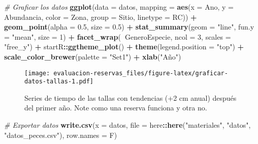 \documentclass[]{krantz}
\newenvironment{Shaded}{\begin{snugshade}}{\end{snugshade}}
\newcommand{\CommentTok}[1]{\textcolor[rgb]{0.56,0.35,0.01}{\textit{#1}}}
\newcommand{\DataTypeTok}[1]{\textcolor[rgb]{0.13,0.29,0.53}{#1}}
\newcommand{\DecValTok}[1]{\textcolor[rgb]{0.00,0.00,0.81}{#1}}
\newcommand{\FloatTok}[1]{\textcolor[rgb]{0.00,0.00,0.81}{#1}}
\newcommand{\KeywordTok}[1]{\textcolor[rgb]{0.13,0.29,0.53}{\textbf{#1}}}
\newcommand{\NormalTok}[1]{#1}
\newcommand{\OperatorTok}[1]{\textcolor[rgb]{0.81,0.36,0.00}{\textbf{#1}}}
\newcommand{\StringTok}[1]{\textcolor[rgb]{0.31,0.60,0.02}{#1}}
\begin{document}
\begin{Shaded}
\begin{Highlighting}[]
\CommentTok{# Graficar los datos}
\KeywordTok{ggplot}\NormalTok{(}\DataTypeTok{data =}\NormalTok{ datos,}
       \DataTypeTok{mapping =} \KeywordTok{aes}\NormalTok{(}\DataTypeTok{x =}\NormalTok{ Ano, }\DataTypeTok{y =}\NormalTok{ Abundancia,}
                     \DataTypeTok{color =}\NormalTok{ Zona, }\DataTypeTok{group =}\NormalTok{ Sitio, }\DataTypeTok{linetype =}\NormalTok{ RC)) }\OperatorTok{+}
\StringTok{  }\KeywordTok{geom_point}\NormalTok{(}\DataTypeTok{alpha =} \FloatTok{0.5}\NormalTok{, }\DataTypeTok{size =} \FloatTok{0.5}\NormalTok{) }\OperatorTok{+}
\StringTok{  }\KeywordTok{stat_summary}\NormalTok{(}\DataTypeTok{geom =} \StringTok{"line"}\NormalTok{, }\DataTypeTok{fun.y =} \StringTok{"mean"}\NormalTok{, }\DataTypeTok{size =} \DecValTok{1}\NormalTok{) }\OperatorTok{+}
\StringTok{  }\KeywordTok{facet_wrap}\NormalTok{(}\OperatorTok{~}\NormalTok{GeneroEspecie, }\DataTypeTok{ncol =} \DecValTok{3}\NormalTok{, }\DataTypeTok{scales =} \StringTok{"free_y"}\NormalTok{) }\OperatorTok{+}
\StringTok{  }\NormalTok{startR}\OperatorTok{::}\KeywordTok{ggtheme_plot}\NormalTok{() }\OperatorTok{+}
\StringTok{  }\KeywordTok{theme}\NormalTok{(}\DataTypeTok{legend.position =} \StringTok{"top"}\NormalTok{) }\OperatorTok{+}
\StringTok{  }\KeywordTok{scale_color_brewer}\NormalTok{(}\DataTypeTok{palette =} \StringTok{"Set1"}\NormalTok{) }\OperatorTok{+}
\StringTok{  }\KeywordTok{xlab}\NormalTok{(}\StringTok{"Año"}\NormalTok{)}
\end{Highlighting}
\end{Shaded}

\begin{figure}
\centering
\texttt{[image: evaluacion-reservas\_files/figure-latex/graficar-datos-tallas-1.pdf]}
\caption{\label{fig:graficar-datos-tallas}Series de tiempo de las tallas con
tendencias (+2 cm anual) después del primer año. Note como una reserva
funciona y otra no.}
\end{figure}

\begin{Shaded}
\begin{Highlighting}[]
\CommentTok{# Exportar datos}
\KeywordTok{write.csv}\NormalTok{(}\DataTypeTok{x =}\NormalTok{ datos,}
          \DataTypeTok{file =}\NormalTok{ here}\OperatorTok{::}\KeywordTok{here}\NormalTok{(}\StringTok{"materiales"}\NormalTok{, }\StringTok{"datos"}\NormalTok{, }\StringTok{"datos_peces.csv"}\NormalTok{),}
          \DataTypeTok{row.names =}\NormalTok{ F)}
\end{Highlighting}
\end{Shaded}
\end{document}
